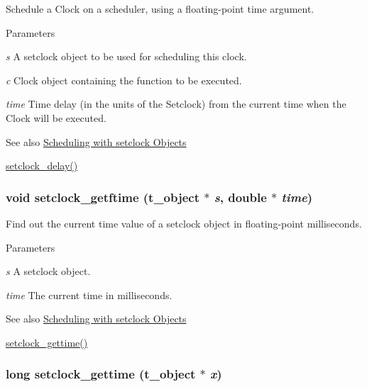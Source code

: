 Schedule a Clock on a scheduler, using a floating-\/point time argument. 
\begin{DoxyParams}{Parameters}
\item[{\em s}]A setclock object to be used for scheduling this clock. \item[{\em c}]Clock object containing the function to be executed. \item[{\em time}]Time delay (in the units of the Setclock) from the current time when the Clock will be executed. \end{DoxyParams}
\begin{DoxySeeAlso}{See also}
\hyperlink{group__clocks_setclock}{Scheduling with setclock Objects} 

\hyperlink{group__clocks_gadf4bd364fd019bed91a587337eb4801e}{setclock\_\-delay()} 
\end{DoxySeeAlso}
\hypertarget{group__clocks_gafd1993dc69a6232cf28683961c97b9e4}{
\subsubsection[{setclock\_\-getftime}]{\setlength{\rightskip}{0pt plus 5cm}void setclock\_\-getftime ({\bf t\_\-object} $\ast$ {\em s}, \/  double $\ast$ {\em time})}}
\label{group__clocks_gafd1993dc69a6232cf28683961c97b9e4}


Find out the current time value of a setclock object in floating-\/point milliseconds. 
\begin{DoxyParams}{Parameters}
\item[{\em s}]A setclock object. \item[{\em time}]The current time in milliseconds. \end{DoxyParams}
\begin{DoxySeeAlso}{See also}
\hyperlink{group__clocks_setclock}{Scheduling with setclock Objects} 

\hyperlink{group__clocks_ga1322ff3659b3d754298c636ad1856903}{setclock\_\-gettime()} 
\end{DoxySeeAlso}
\hypertarget{group__clocks_ga1322ff3659b3d754298c636ad1856903}{
\subsubsection[{setclock\_\-gettime}]{\setlength{\rightskip}{0pt plus 5cm}long setclock\_\-gettime ({\bf t\_\-object} $\ast$ {\em x})}}
\label{group__clocks_ga1322ff3659b3d754298c636ad1856903}



